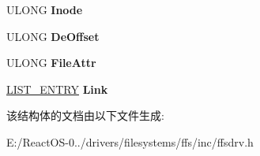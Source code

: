\begin{DoxyCompactItemize}
U\+L\+O\+NG {\bfseries Inode}
\item 
\mbox{\label{struct___f_f_s___m_c_b_af711b41dc6e2c10ad50dfd935bd3cbba}} 
U\+L\+O\+NG {\bfseries De\+Offset}
\item 
\mbox{\label{struct___f_f_s___m_c_b_a832f8752b401120debfc55bf9e8adde5}} 
U\+L\+O\+NG {\bfseries File\+Attr}
\item 
\mbox{\label{struct___f_f_s___m_c_b_a173a9254b5391171ff3a817c1583fffc}} 
\hyperlink{struct___l_i_s_t___e_n_t_r_y}{L\+I\+S\+T\+\_\+\+E\+N\+T\+RY} {\bfseries Link}
\end{DoxyCompactItemize}


该结构体的文档由以下文件生成\+:\begin{DoxyCompactItemize}
\item 
E\+:/\+React\+O\+S-\/0../drivers/filesystems/ffs/inc/ffsdrv.\+h\end{DoxyCompactItemize}
